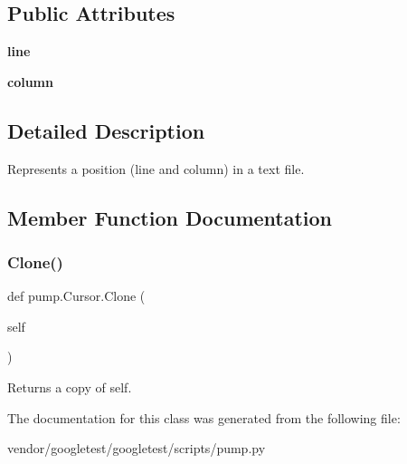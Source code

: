 \subsection*{Public Attributes}
\begin{DoxyCompactItemize}
\item 
\mbox{\label{classpump_1_1_cursor_aee8d8b67360da7fc4e635540cb41d48c}} 
{\bfseries line}
\item 
\mbox{\label{classpump_1_1_cursor_ae73db76c3a845a82afb334633864254e}} 
{\bfseries column}
\end{DoxyCompactItemize}


\subsection{Detailed Description}
\begin{DoxyVerb}Represents a position (line and column) in a text file.\end{DoxyVerb}
 

\subsection{Member Function Documentation}
\mbox{\label{classpump_1_1_cursor_af68c9be83b0af87db441b21bc6ce8114}} 
\subsubsection{\texorpdfstring{Clone()}{Clone()}}
{\footnotesize\ttfamily def pump.\+Cursor.\+Clone (\begin{DoxyParamCaption}\item[{}]{self }\end{DoxyParamCaption})}

\begin{DoxyVerb}Returns a copy of self.\end{DoxyVerb}
 

The documentation for this class was generated from the following file\+:\begin{DoxyCompactItemize}
\item 
vendor/googletest/googletest/scripts/pump.\+py\end{DoxyCompactItemize}
